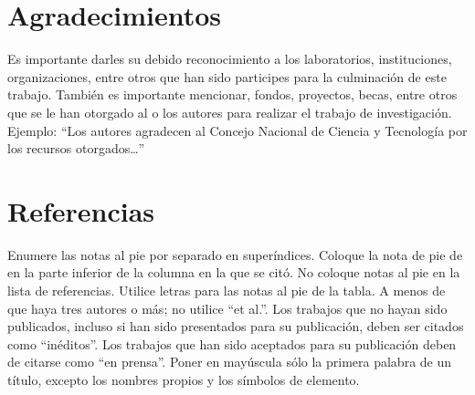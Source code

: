     \section{Agradecimientos}
    
    Es importante darles su debido reconocimiento a los laboratorios, instituciones, organizaciones, entre otros que han sido participes para la culminación de este trabajo. También es importante mencionar, fondos, proyectos, becas, entre otros que se le han otorgado al o los autores para realizar el trabajo de investigación. Ejemplo: “Los autores agradecen al Concejo Nacional de Ciencia y Tecnología por los recursos otorgados…”
    
    \section*{Referencias}
    
    Enumere las notas al pie por separado en superíndices. Coloque la nota de pie de en la parte inferior de la columna en la que se citó. No coloque notas al pie en la lista de referencias. Utilice letras para las notas al pie de la tabla.
    A menos de que haya tres autores o más; no utilice “et al.”. Los trabajos que no hayan sido publicados, incluso si han sido presentados para su publicación, deben ser citados como “inéditos”. Los trabajos que han sido aceptados para su publicación deben de citarse como “en prensa”. Poner en mayúscula sólo la primera palabra de un título, excepto los nombres propios y los símbolos de elemento. 
    
    

